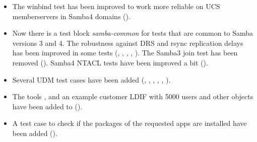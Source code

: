 \begin{itemize}
\item The winbind test has been improved to work more reliable on UCS memberservers in Samba4 domains ().

\item Now there is a test block \emph{samba-common} for tests that are common to Samba versions 3 and 4.
The robustness against DRS and rsync replication delays has been improved in some tests (, , , , ). The Samba3 join test has been removed (). Samba4 NTACL tests have been improved a bit ().

\item Several UDM test cases have been added (, , , , , ).

\item The tools , 
and an example customer LDIF with 5000 users and other objects have been added to
 ().

\item A test case to check if the packages of the requested apps are installed have been added ().

\end{itemize}

